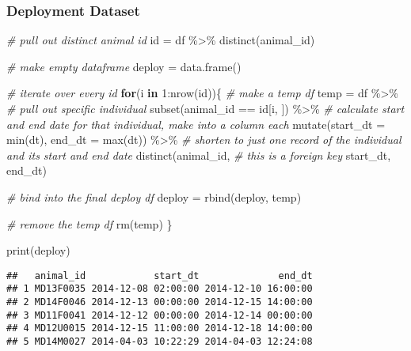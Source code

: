 \documentclass[
]{book}
\newenvironment{Shaded}{\begin{snugshade}}{\end{snugshade}}
\newcommand{\AttributeTok}[1]{\textcolor[rgb]{0.77,0.63,0.00}{#1}}
\newcommand{\CommentTok}[1]{\textcolor[rgb]{0.56,0.35,0.01}{\textit{#1}}}
\newcommand{\ControlFlowTok}[1]{\textcolor[rgb]{0.13,0.29,0.53}{\textbf{#1}}}
\newcommand{\DecValTok}[1]{\textcolor[rgb]{0.00,0.00,0.81}{#1}}
\newcommand{\FunctionTok}[1]{\textcolor[rgb]{0.00,0.00,0.00}{#1}}
\newcommand{\NormalTok}[1]{#1}
\newcommand{\OtherTok}[1]{\textcolor[rgb]{0.56,0.35,0.01}{#1}}
\newcommand{\SpecialCharTok}[1]{\textcolor[rgb]{0.00,0.00,0.00}{#1}}
\begin{document}
\hypertarget{deployment-dataset}{%
\subsubsection{Deployment Dataset}\label{deployment-dataset}}

\begin{Shaded}
\begin{Highlighting}[]
\CommentTok{\# pull out distinct animal id}
\NormalTok{id }\OtherTok{=}\NormalTok{ df }\SpecialCharTok{\%\textgreater{}\%}
  \FunctionTok{distinct}\NormalTok{(animal\_id)}

\CommentTok{\# make empty dataframe}
\NormalTok{deploy }\OtherTok{=} \FunctionTok{data.frame}\NormalTok{()}

\CommentTok{\# iterate over every id}
\ControlFlowTok{for}\NormalTok{(i }\ControlFlowTok{in} \DecValTok{1}\SpecialCharTok{:}\FunctionTok{nrow}\NormalTok{(id))\{}
  \CommentTok{\# make a temp df}
\NormalTok{  temp }\OtherTok{=}\NormalTok{ df }\SpecialCharTok{\%\textgreater{}\%}
    \CommentTok{\# pull out specific individual}
    \FunctionTok{subset}\NormalTok{(animal\_id }\SpecialCharTok{==}\NormalTok{ id[i, ]) }\SpecialCharTok{\%\textgreater{}\%}
    \CommentTok{\# calculate start and end date for that individual, make into a column each}
    \FunctionTok{mutate}\NormalTok{(}\AttributeTok{start\_dt =} \FunctionTok{min}\NormalTok{(dt),}
           \AttributeTok{end\_dt =} \FunctionTok{max}\NormalTok{(dt)) }\SpecialCharTok{\%\textgreater{}\%}
    \CommentTok{\# shorten to just one record of the individual and its start and end date}
    \FunctionTok{distinct}\NormalTok{(animal\_id, }\CommentTok{\# this is a foreign key}
\NormalTok{           start\_dt,}
\NormalTok{           end\_dt)}
  
  \CommentTok{\# bind into the final deploy df}
\NormalTok{  deploy }\OtherTok{=} \FunctionTok{rbind}\NormalTok{(deploy, temp)}
  
  \CommentTok{\# remove the temp df}
  \FunctionTok{rm}\NormalTok{(temp)}
\NormalTok{\}}

\FunctionTok{print}\NormalTok{(deploy)}
\end{Highlighting}
\end{Shaded}

\begin{verbatim}
##   animal_id            start_dt              end_dt
## 1 MD13F0035 2014-12-08 02:00:00 2014-12-10 16:00:00
## 2 MD14F0046 2014-12-13 00:00:00 2014-12-15 14:00:00
## 3 MD11F0041 2014-12-12 00:00:00 2014-12-14 00:00:00
## 4 MD12U0015 2014-12-15 11:00:00 2014-12-18 14:00:00
## 5 MD14M0027 2014-04-03 10:22:29 2014-04-03 12:24:08
\end{verbatim}
\end{document}
